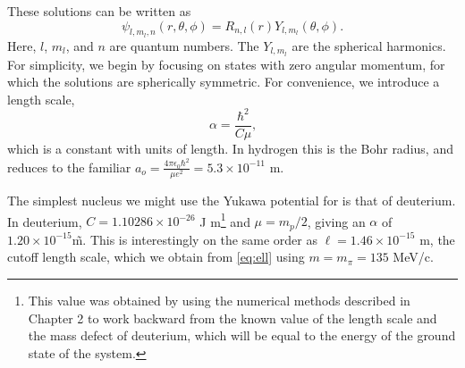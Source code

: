 \documentclass[12pt,twoside]{reedthesis}
\newcommand{\eqn}[1]{\begin{equation}#1\end{equation}}
\begin{document}
These solutions can be written as \cite{griffiths_introduction_2005}
\eqn{
\psi_{l, m_l, n} (r, \theta, \phi) = R_{n,l}(r) Y_{l,m_l}(\theta,\phi)\mbox{.}
}
Here, $l$, $m_l$, and $n$ are quantum numbers. The $Y_{l, m_l}$ are the spherical harmonics. For simplicity, we begin by focusing on states with zero angular momentum, for which the solutions are spherically symmetric.
For convenience, we introduce a length scale, 
\eqn{
\alpha = \frac{\hbar^2}{C \mu}\mbox{,}
\label{eq:bohrradius}
}
which is a constant with units of length. 
In hydrogen this is the Bohr radius, and reduces to the familiar $a_o = \frac{4\pi \epsilon_0 \hbar^2}{\mu e^2} = 5.3 \times 10^{-11}$ m. 

The simplest nucleus we might use the Yukawa potential for is that of deuterium. In deuterium, $C =  1.10286 \times 10^{-26}$ J m\footnote{This value was obtained by using the numerical methods described in Chapter 2 to work backward from the known value of the length scale and the mass defect of deuterium, which will be equal to the energy of the ground state of the system.} and $\mu = m_p/2$, giving an $\alpha$ of $1.20 \times 10^{-15}$\~m. This is interestingly on the same order as $\ell = 1.46 \times 10^{-15}$ m, the cutoff length scale, which we obtain from \eqref{eq:ell} using $m = m_{\pi} = 135$ MeV/c.
\end{document}
